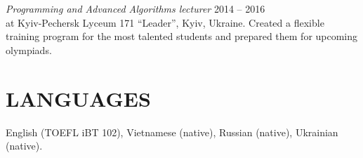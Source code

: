 \documentclass[margin, 10pt]{res} %
\begin{document}
\begin{resume}
{{\sl Programming and Advanced Algorithms lecturer} \hfill 2014 -- 2016}\\
at Kyiv-Pechersk Lyceum 171 \enquote{Leader}, Kyiv, Ukraine. Created a flexible training program for the most talented students and prepared them for upcoming olympiads.


\section{LANGUAGES}

English (TOEFL iBT 102), Vietnamese (native), Russian (native), Ukrainian (native).

\end{resume}
\end{document}
